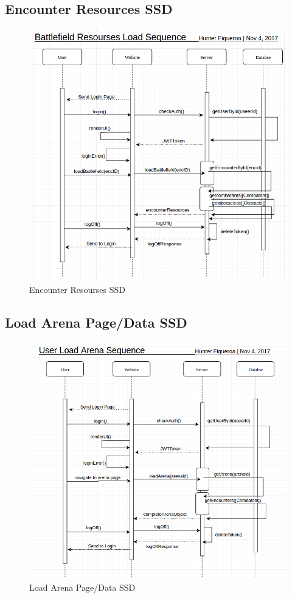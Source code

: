 \documentclass[12pt,a4paper]{report}
\begin{document}
	\newpage
	\subsection {Encounter Resources SSD}
	\begin{figure}[H]
		\centering
		\centerline{\includegraphics[scale=.7, angle=90]{ssd_resourses}}
		\caption{Encounter Resourses SSD}
		\label{fig: Encounter Resourses SSD }
	\end{figure}
	
	\newpage
	\subsection {Load Arena Page/Data SSD}
	\begin{figure}[H]
		\centering
		\centerline{\includegraphics[scale=.7, angle=90]{ssd_arena}}
		\caption{Load Arena Page/Data SSD}
		\label{fig: Load Arena Page/Data SSD }
	\end{figure}
	
\end{document}
